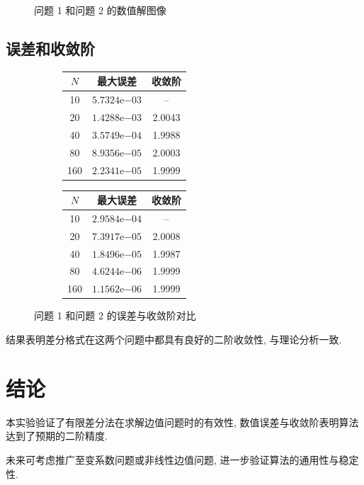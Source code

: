 \documentclass[11pt]{article}
\begin{document}
\begin{figure}[ht]
\begin{subfigure}[b]{0.45\textwidth}
	\end{subfigure}
	\caption{问题 1 和问题 2 的数值解图像}
\end{figure}

\subsection{误差和收敛阶}
\begin{figure}[ht]
	\centering
	\begin{subfigure}[b]{0.45\textwidth}
		\centering
		\begin{tabular}{ccc}
		\toprule
		$N$ & 最大误差 & 收敛阶 \\
		\midrule
		10  & $5.7324\mathrm{e}{-03}$ & --     \\
		20  & $1.4288\mathrm{e}{-03}$ & 2.0043 \\
		40  & $3.5749\mathrm{e}{-04}$ & 1.9988 \\
		80  & $8.9356\mathrm{e}{-05}$ & 2.0003 \\
		160 & $2.2341\mathrm{e}{-05}$ & 1.9999 \\
		\bottomrule
		\end{tabular}
	\end{subfigure}
	\hspace{0.5cm}
	\begin{subfigure}[b]{0.45\textwidth}
		\centering
		\begin{tabular}{ccc}
		\toprule
		$N$ & 最大误差 & 收敛阶 \\
		\midrule
		10  & $2.9584\mathrm{e}{-04}$ & --     \\
		20  & $7.3917\mathrm{e}{-05}$ & 2.0008 \\
		40  & $1.8496\mathrm{e}{-05}$ & 1.9987 \\
		80  & $4.6244\mathrm{e}{-06}$ & 1.9999 \\
		160 & $1.1562\mathrm{e}{-06}$ & 1.9999 \\
		\bottomrule
		\end{tabular}
	\end{subfigure}
	\caption{问题 1 和问题 2 的误差与收敛阶对比}
\end{figure}

结果表明差分格式在这两个问题中都具有良好的二阶收敛性, 与理论分析一致.

\section{结论}

本实验验证了有限差分法在求解边值问题时的有效性, 数值误差与收敛阶表明算法达到了预期的二阶精度.

未来可考虑推广至变系数问题或非线性边值问题, 进一步验证算法的通用性与稳定性.
\end{document}
